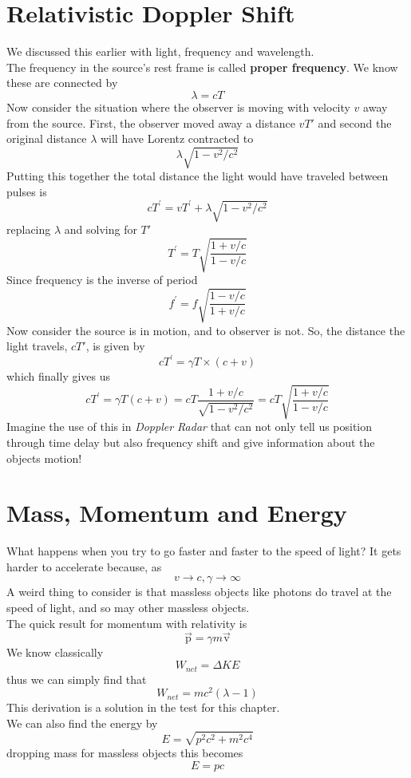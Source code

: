 \section{Relativistic Doppler Shift}
We discussed this earlier with light, frequency and wavelength. \\
The frequency in the source's rest frame is called \textbf{proper frequency}. We know these are connected by
\[ \lambda = cT \]
Now consider the situation where the observer is moving with velocity $ v $ away from the source. First, the observer moved away a distance $ vT' $ and second the original distance $ \lambda $ will have Lorentz contracted to \[ \lambda\sqrt{1-v^2/c^2} \]
Putting this together the total distance the light would have traveled between pulses is 
\[ c T ^ { \prime } = v T ^ { \prime } + \lambda \sqrt { 1 - v ^ { 2 } / c ^ { 2 } } \]
replacing $ \lambda $ and solving for $ T' $
\[ T ^ { \prime } = T \sqrt { \frac { 1 + v / c } { 1 - v / c } } \]
Since frequency is the inverse of period
\[ f ^ { \prime } = f \sqrt { \frac { 1 - v / c } { 1 + v / c } } \]
\indent Now consider the source is in motion, and to observer is not. So, the distance the light travels, $ cT' $, is given by 
\[ c T ^ { \prime } = \gamma T \times ( c + v ) \]
which finally gives us
\[ c T ^ { \prime } = \gamma T ( c + v ) = c T \frac { 1 + v / c } { \sqrt { 1 - v ^ { 2 } / c ^ { 2 } } } = c T \sqrt { \frac { 1 + v / c } { 1 - v / c } } \]
\indent Imagine the use of this in \textit{Doppler Radar} that can not only tell us position through time delay but also frequency shift and give information about the objects motion!
\section{Mass, Momentum and Energy}
What happens when you try to go faster and faster to the speed of light? It gets harder to accelerate because, as
\[ v \rightarrow c, \gamma \rightarrow \infty \]
A weird thing to consider is that massless objects like photons do travel at the speed of light, and so may other massless objects. \\
The quick result for momentum with relativity is 
\[ \vec { \mathrm { p } } = \gamma m \vec { \mathrm { v } } \]
We know classically 
\[ W_{net} = \Delta KE  \]
thus we can simply find that 
\[ W_{net} = mc^2(\lambda - 1) \]
This derivation is a solution in the test for this chapter. \\
We can also find the energy by 
\[ E = \sqrt{p^2 c^2 + m^2c^4} \]
dropping mass for massless objects this becomes
\[ E = pc \]
